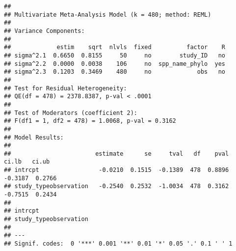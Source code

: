 \documentclass[]{article}
\newenvironment{Shaded}{\begin{snugshade}}{\end{snugshade}}
\newcommand{\KeywordTok}[1]{\textcolor[rgb]{0.13,0.29,0.53}{\textbf{#1}}}
\newcommand{\DataTypeTok}[1]{\textcolor[rgb]{0.13,0.29,0.53}{#1}}
\newcommand{\DecValTok}[1]{\textcolor[rgb]{0.00,0.00,0.81}{#1}}
\newcommand{\StringTok}[1]{\textcolor[rgb]{0.31,0.60,0.02}{#1}}
\newcommand{\CommentTok}[1]{\textcolor[rgb]{0.56,0.35,0.01}{\textit{#1}}}
\newcommand{\OperatorTok}[1]{\textcolor[rgb]{0.81,0.36,0.00}{\textbf{#1}}}
\newcommand{\NormalTok}[1]{#1}
\begin{document}
\begin{Shaded}
\end{Shaded}

\begin{verbatim}
## 
## Multivariate Meta-Analysis Model (k = 480; method: REML)
## 
## Variance Components:
## 
##             estim    sqrt  nlvls  fixed          factor    R 
## sigma^2.1  0.6650  0.8155     50     no        study_ID   no 
## sigma^2.2  0.0000  0.0038    106     no  spp_name_phylo  yes 
## sigma^2.3  0.1203  0.3469    480     no             obs   no 
## 
## Test for Residual Heterogeneity:
## QE(df = 478) = 2378.8387, p-val < .0001
## 
## Test of Moderators (coefficient 2):
## F(df1 = 1, df2 = 478) = 1.0068, p-val = 0.3162
## 
## Model Results:
## 
##                        estimate      se     tval   df    pval    ci.lb   ci.ub 
## intrcpt                 -0.0210  0.1515  -0.1389  478  0.8896  -0.3187  0.2766 
## study_typeobservation   -0.2540  0.2532  -1.0034  478  0.3162  -0.7515  0.2434 
##  
## intrcpt 
## study_typeobservation 
## 
## ---
## Signif. codes:  0 '***' 0.001 '**' 0.01 '*' 0.05 '.' 0.1 ' ' 1
\end{verbatim}
\end{document}

